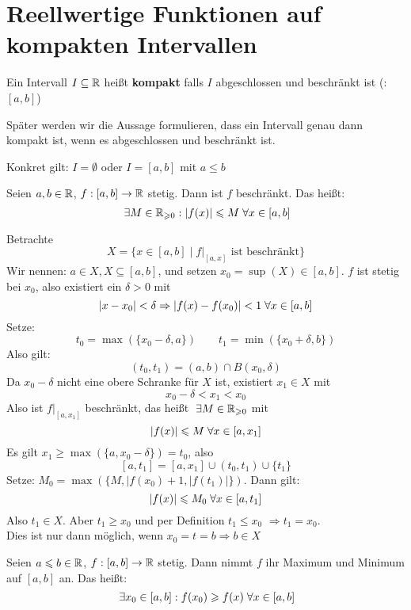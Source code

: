 \documentclass[main.tex]{subfiles}
\begin{document}
\section{Reellwertige Funktionen auf kompakten Intervallen}

\begin{Definition}[Kompaktheit]
  Ein Intervall $I\subseteq \mathbb{R}$ heißt \textbf{kompakt} falls $I$ abgeschlossen und beschränkt ist (: $[a,b]$)
\end{Definition}
\begin{Bemerkung}
  Später werden wir die Aussage formulieren, dass ein Intervall genau dann kompakt ist, wenn es abgeschlossen und beschränkt ist.

  Konkret gilt: $I = \emptyset$ oder $I = [a,b]$ mit $a \leq b$
\end{Bemerkung}

\begin{Theorem}
  Seien $a,b\in \mathbb{R}$, $f:[a,b]\to \mathbb{R}$ stetig. Dann ist $f$ beschränkt. Das heißt:
  $$\;\exists M \in \mathbb{R}_{\geqslant 0}: |f(x)| \leqslant M \;\forall x \in [a,b]$$
\end{Theorem}

\begin{Beweis}
  Betrachte
  $$X = \{x \in [a,b]\mid f|_{[a,x]} \text{ ist beschränkt}\}$$
  Wir nennen: $a \in X, X\subseteq [a,b]$, und setzen $x_0 = \sup(X) \in [a,b]$. $f$ ist stetig bei $x_0$, also existiert ein $\delta > 0$ mit
  $$|x-x_0| < \delta \Rightarrow |f(x)-f(x_0)| < 1 \;\forall x \in [a,b]$$
  Setze:
  $$t_0 = \max(\{x_0 - \delta, a\}) \qquad t_1 = \min(\{x_0 + \delta, b\})$$
  Also gilt:
  $$(t_0,t_1) = (a,b) \cap B(x_0,\delta)$$
  Da $x_0 - \delta$ nicht eine obere Schranke für $X$ ist, existiert $x_1 \in X$ mit
  $$x_0 - \delta < x_1 < x_0$$
  Also ist $f|_{[a,x_1]}$ beschränkt, das heißt $\;\exists M \in \mathbb{R}_{\geqslant 0}$ mit
  $$|f(x)| \leqslant M \;\forall x\in [a,x_1]$$
  Es gilt $x_1 \geq \max(\{a, x_0-\delta\}) = t_0$, also
  $$[a,t_1] = [a,x_1] \cup (t_0,t_1)\cup \{t_1\}$$
  Setze: $M_0 = \max(\{M,|f(x_0)+1,|f(t_1)|\})$. Dann gilt:
  $$|f(x)| \leqslant M_0 \;\forall x \in [a,t_1]$$
  Also $t_1 \in X$. Aber $t_1 \geq x_0$ und per Definition $t_1 \leq x_0$ $\Rightarrow t_1 = x_0$.\\
  Dies ist nur dann möglich, wenn $x_0 = t =b \Rightarrow b \in X$
\end{Beweis}

\begin{Theorem}
  Seien  $a \leqslant b \in \mathbb{R}$, $f:[a,b] \to \mathbb{R}$ stetig. Dann nimmt $f$ ihr Maximum und Minimum auf $[a,b]$ an. Das heißt:
  $$\;\exists x_0 \in [a,b] : f(x_0) \geqslant f(x) \;\forall x\in [a,b]$$
\end{Theorem}
\end{document}

